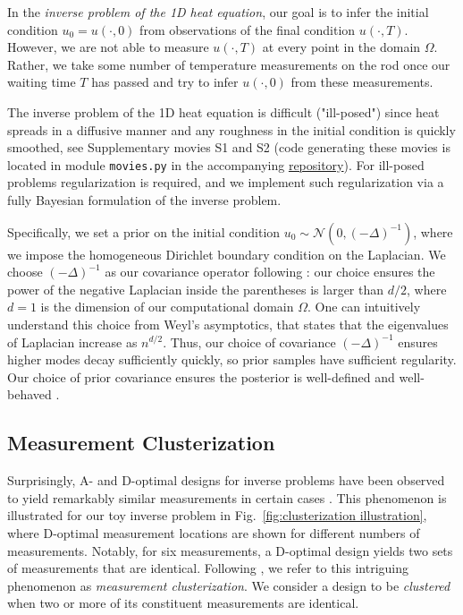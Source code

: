 In the \emph{inverse problem of the 1D heat equation}, our goal is to
infer the initial condition $u_0 = u(\cdot, 0)$ from observations of
the final condition $u(\cdot, T)$. However, we are not able to measure
$u(\cdot, T)$ at every point in the domain $\Omega$. Rather, we take
some number of temperature measurements on the rod once our waiting
time $T$ has passed and try to infer $u(\cdot, 0)$ from these
measurements.

The inverse problem of the 1D heat equation is difficult ("ill-posed")
since heat spreads in a diffusive manner and any roughness in the
initial condition is quickly smoothed, see Supplementary movies S1 and
S2 (code generating these movies is located in module
\texttt{movies.py} in the accompanying
\href{https://github.com/yairdaon/OED}{repository}). For ill-posed
problems regularization is required, and we implement such
regularization via a fully Bayesian formulation of the inverse
problem.

Specifically, we set a prior on the initial condition $u_0 \sim
\mathcal{N}(0, (-\Delta)^{-1})$, where we impose the homogeneous
Dirichlet boundary condition on the Laplacian. We choose
$(-\Delta)^{-1}$ as our covariance operator following \cite{Stuart10}:
our choice ensures the power of the negative Laplacian inside the
parentheses is larger than $d/2$, where $d=1$ is the dimension of our
computational domain $\Omega$. One can intuitively understand this
choice from Weyl's asymptotics, that states that the eigenvalues of
Laplacian increase as $n^{d/2}$. Thus, our choice of covariance
$(-\Delta)^{-1}$ ensures higher modes decay sufficiently quickly, so
prior samples have sufficient regularity. Our choice of prior
covariance ensures the posterior is well-defined and well-behaved
\cite[Theorem 3.1 and Lemma 6.25]{Stuart10}.

\subsection{Measurement Clusterization}
Surprisingly, A- and D-optimal designs for inverse problems have been
observed to yield remarkably similar measurements in certain cases
\cite{fedorovDesignSpatialExperiments1996, nyberg2012, fedorov1997,
  Ucinski05, neitzel2019sparse}. This phenomenon is illustrated for
our toy inverse problem in Fig.~\ref{fig:clusterization illustration},
where D-optimal measurement locations are shown for different numbers
of measurements. Notably, for six measurements, a D-optimal design
yields two sets of measurements that are identical. Following
\cite{Ucinski05}, we refer to this intriguing phenomenon as
\emph{measurement clusterization}. We consider a design to be
\emph{clustered} when two or more of its constituent measurements are
identical.

